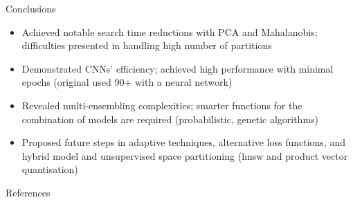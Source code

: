 \documentclass[10pt, aspectratio=169]{beamer}
\begin{document}
\begin{frame}{Conclusions}

\begin{block}{\centering \Large}
    \hspace{1cm}
    \begin{itemize}
        \item Achieved notable search time reductions with PCA and Mahalanobis; difficulties presented in handling high number of partitions
        \item Demonstrated CNNs' efficiency; achieved high performance with minimal epochs (original used 90+ with a neural network)
        \item Revealed multi-ensembling complexities; smarter functions for the combination of models are required (probabilistic, genetic algorithms)
        \item Proposed future steps in adaptive techniques, alternative loss functions, and hybrid model and  unsupervised space partitioning (hnsw and product vector quantisation)
    \end{itemize}
\end{block}

\end{frame}

\begin{frame}[allowframebreaks]{References}

  
  

\end{frame}
\end{document}

